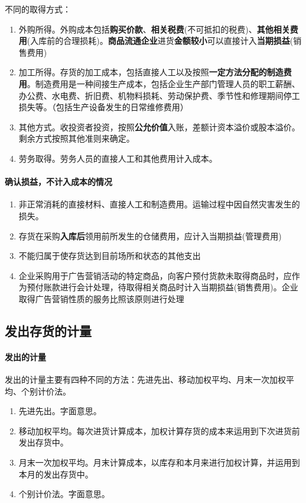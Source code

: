 \documentclass[UTF8,12pt]{ctexart}
\numberwithin{equation}{section} %
\numberwithin{figure}{section}
\numberwithin{table}{section}
\begin{document}
	不同的取得方式：
	\begin{enumerate}
		\item 外购所得。外购成本包括\textbf{购买价款}、\textbf{相关税费}(不可抵扣的税费)、\textbf{其他相关费用}(入库前的合理损耗)。\textbf{商品流通企业}进货\textbf{金额较小}可以直接计入\textbf{当期损益}(销售费用)
		
		\item 加工所得。存货的加工成本，包括直接人工以及按照\textbf{一定方法分配的制造费用}。制造费用是一种间接生产成本，包括企业生产部门管理人员的职工薪酬、办公费、水电费、折旧费、机物料损耗、劳动保护费、季节性和修理期间停工损失等。（包括生产设备发生的日常维修费用）
		
		\item 其他方式。收投资者投资，按照\textbf{公允价值}入账，差额计资本溢价或股本溢价。剩余方式按照其他准则来确定。
		
		\item 劳务取得。劳务人员的直接人工和其他费用计入成本。
	\end{enumerate}
	
	\paragraph{确认损益，不计入成本的情况}
	\begin{enumerate}
		\item 非正常消耗的直接材料、直接人工和制造费用。运输过程中因自然灾害发生的损失。
		
		\item 存货在采购\textbf{入库后}领用前所发生的仓储费用，应计入当期损益(管理费用)
		
		\item 不能归属于使存货达到目前场所和状态的其他支出
		
		\item 企业采购用于广告营销活动的特定商品，向客户预付货款未取得商品时，应作为预付账款进行会计处理，待取得相关商品时计入当期损益(销售费用)。企业取得广告营销性质的服务比照该原则进行处理 
	\end{enumerate}
	
	\subsection{发出存货的计量}
	\paragraph{发出的计量} 发出的计量主要有四种不同的方法：先进先出、移动加权平均、月末一次加权平均、个别计价法。
	\begin{enumerate}
		\item 先进先出。字面意思。
		
		\item 移动加权平均。每次进货计算成本，加权计算存货的成本来运用到下次进货前发出存货中。
		
		\item 月末一次加权平均。月末计算成本，以库存和本月来进行加权计算，并运用到本月的发出存货中。
		
		\item 个别计价法。字面意思。
	\end{enumerate}
	
\end{document}
